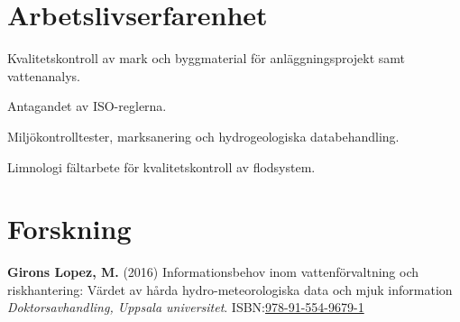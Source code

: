 \documentclass[]{gironslopez-resume-se}
\begin{document}
  \begin{minipage}[t]{0.66\textwidth}

    \section{Arbetslivserfarenhet}
    
    
    \sectionsep
    
    
    \sectionsep

    \vspace{\topsep}
    \begin{tightemize}
      \item Kvalitetskontroll av mark och byggmaterial för anläggningsprojekt samt vattenanalys.
      \item Antagandet av ISO-reglerna.
    \end{tightemize}

    \sectionsep

    \begin{tightemize}
      \item Miljökontrolltester, marksanering och hydrogeologiska databehandling. 
      \item Limnologi fältarbete för kvalitetskontroll av flodsystem.
    \end{tightemize}

    \sectionsep

    \section{Forskning}
    
    \textbf{Girons Lopez, M.} (2016) Informationsbehov inom vattenförvaltning och riskhantering: Värdet av hårda hydro-meteorologiska data och mjuk information \textit{Doktorsavhandling, Uppsala universitet}. ISBN:\href{http://www.diva-portal.org/smash/record.jsf?pid=diva2\%3A957429\&dswid=-4195}{978-91-554-9679-1}
    

\end{minipage}
\end{document}

